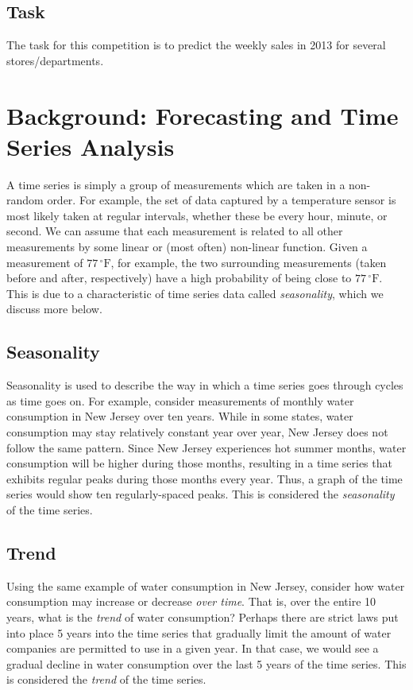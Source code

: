 \documentclass{article}
\begin{document}
\subsection{Task}
The task for this competition is to predict the weekly sales in 2013 for several stores/departments. 

\section{Background: Forecasting and Time Series Analysis}

A time series is simply a group of measurements which are taken in a non-random order. For example, the set of data captured by a temperature sensor is most likely taken at regular intervals, whether these be every hour, minute, or second. We can assume that each measurement is related to all other measurements by some linear or (most often) non-linear function. Given a measurement of $77\,^{\circ}\mathrm{F}$, for example, the two surrounding measurements (taken before and after, respectively) have a high probability of being close to $77\,^{\circ}\mathrm{F}$. This is due to a characteristic of time series data called \emph{seasonality}, which we discuss more below.

\subsection{Seasonality}
Seasonality is used to describe the way in which a time series goes through cycles as time goes on. For example, consider measurements of monthly water consumption in New Jersey over ten years. While in some states, water consumption may stay relatively constant year over year, New Jersey does not follow the same pattern. Since New Jersey experiences hot summer months, water consumption will be higher during those months, resulting in a time series that exhibits regular peaks during those months every year. Thus, a graph of the time series would show ten regularly-spaced peaks. This is considered the \emph{seasonality} of the time series.

\subsection{Trend}
Using the same example of water consumption in New Jersey, consider how water consumption may increase or decrease \emph{over time}. That is, over the entire 10 years, what is the \emph{trend} of water consumption? Perhaps there are strict laws put into place 5 years into the time series that gradually limit the amount of water companies are permitted to use in a given year. In that case, we would see a gradual decline in water consumption over the last 5 years of the time series. This is considered the \emph{trend} of the time series.
\end{document}
